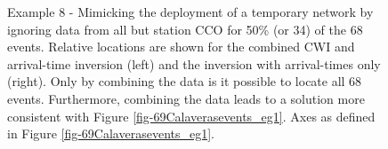 \documentclass[12pt,double]{article}
\begin{document}


\begin{figure}
\caption{Example 8 - Mimicking the deployment of a temporary network
by ignoring data from all but station CCO for 50\% (or 34) of the 68
events. Relative locations are shown for the combined CWI and arrival-time 
inversion (left) and the inversion with arrival-times only
(right). Only by combining the data is it possible to locate all 68
events. Furthermore, combining the data leads to a solution more
consistent with Figure \ref{fig-69Calaverasevents_eg1}. Axes as defined 
in Figure \ref{fig-69Calaverasevents_eg1}.}
\label{fig-68Calaverasevents_ttsubsetandcoda1}
\end{figure}









\end{document}
